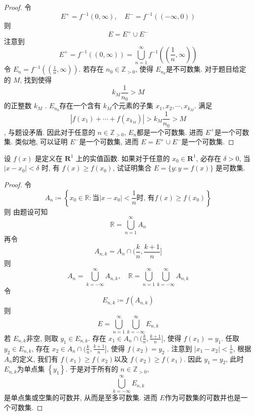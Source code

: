 \documentclass[../main.tex]{subfiles}
\begin{document}
\begin{proof}
令 \[
E^{+ }= f^{-1} \left( 0,\infty \right) ,\quad E^{-}= f^{-1} \left( (-\infty,0) \right) 
\]则 \[
E= E^{+ }\cup E^{-}
\]注意到\[
  E^{+ }= f^{-1} \left( (0,\infty) \right)= \bigcup _{n = 1}^{\infty}f^{-1} \left( \left( \frac{1 }{n },\infty  \right) \right)  
  \]令 \(  E_{n}= f^{-1} \left( \left( \frac{1 }{n },\infty  \right) \right)   \). 若存在 \(  n_0\in \mathbb{Z} _{> 0}  \), 使得 \(  E_{n_0}  \)是不可数集. 对于题目给定的 \(  M  \), 找到使得  \[
  k_{M}\frac{1 }{n_0 }> M 
  \]的正整数 \(  k_{M}  \)      . \(  E_{n_0}  \)存在一个含有 \(  k_{M}  \)个元素的子集 \(  x_1,x_2,\cdots ,x_{k_{M}}  \). 满足 \[
  \left| f\left( x_1 \right)+ \cdots + f\left( x_{k_{M}} \right)   \right|>  k_{M}\frac{1 }{n_0 }> M  
  \], 与题设矛盾. 因此对于任意的 \(  n\in \mathbb{Z} _{> 0}  \), \(  E_{n}  \)都是一个可数集. 进而 \(  E^{+ }  \)是一个可数集.      类似地, 可以证明 \(  E^{-}  \)是一个可数集, 进而 \(  E= E^{+ }\cup E^{-}  \)是一个可数集.  
\end{proof}
 \begin{exercise}{}{}
设 $f(x)$ 是定义在 $\mathbf{R}^1$ 上的实值函数. 如果对于任意的 $x_0 \in \mathbf{R}^1$, 必存在 $\delta > 0$, 当 $|x - x_0| < \delta$ 时, 有 $f(x) \ge f(x_0)$, 试证明集合 $E = \{y: y = f(x)\}$ 是可数集.
\end{exercise}
\begin{proof}
    令 \[
    A_{n}\coloneqq \left\{ x_0\in \mathbb{R} : \text{当} \left| x-x_0 \right|< \frac{1 }{n }\text{时, 有} f\left( x \right)\ge f\left( x_0 \right)     \right\}
    \] 则 由题设可知 \[
    \mathbb{R} = \bigcup _{n = 1}^{\infty}A_{n}
    \]再令 \[
    A_{n,k}=  A_{n}\cap (\frac{k }{n },\frac{k+ 1 }{n }  ]
    \]则 \[
   A_{n}= \bigcup _{k= -\infty}^{\infty}A_{n,k},\quad  \mathbb{R} = \bigcup _{n = 1}^{\infty}\bigcup _{k = -\infty}^{\infty}A_{n,k}
    \]令 \[
    E_{n,k}\coloneqq  f\left( A_{n,k} \right) 
    \]则 \[
    E= \bigcup _{n = 1}^{\infty}\bigcup _{k= -\infty}^{\infty}E_{n,k}
    \] 若 \(  E_{n,k}  \)非空, 则取 \(  y_1\in E_{n,k}  \). 存在 \(  x_1 \in A_{n}\cap (\frac{k }{n },\frac{k+ 1 }{n }  ]  \), 使得 \(  f\left( x_1 \right)= y_1   \). 任取 \(  y_2 \in E_{n,k}  \), 存在 \(  x_2\in A_{n}\cap (\frac{k }{n },\frac{k+ 1 }{n }  ]  \), 使得 \(  f\left( x_2 \right)= y_2   \)       . 注意到 \(  \left| x_1-x_2 \right|< \frac{1 }{n }    \), 根据 \(  A_{n}  \)的定义, 我们有 \(  f\left( x_1 \right)\ge f\left( x_2 \right)    \)以及 \(  f\left( x_2 \right)\ge f\left( x_1 \right)    \). 因此 \(  y_1= y_2  \), 此时 \(  E_{n,k}  \)为单点集 \(  \left\{ y_1 \right\}  \).        于是对于所有的 \(  n \in \mathbb{Z} _{> 0}  \),  \[
    \bigcup _{k= -\infty}^{\infty}E_{n,k}
    \]是单点集或空集的可数并, 从而是至多可数集.  进而 \(  E  \)作为可数集的可数并也是一个可数集. 
\end{proof}
\end{document}
